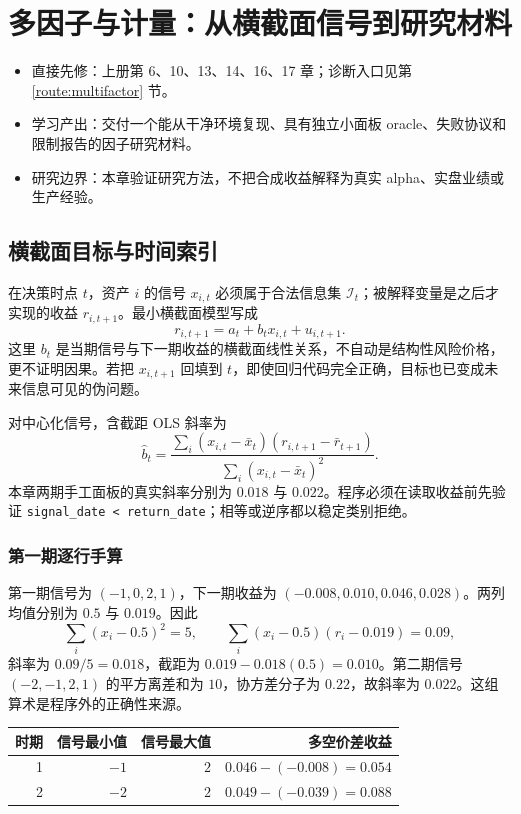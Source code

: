 \chapter{多因子与计量：从横截面信号到研究材料}
\label{ch:lower-multifactor}

\begin{itemize}
  \item 直接先修：上册第 6、10、13、14、16、17 章；诊断入口见第 \ref{route:multifactor} 节。
  \item 学习产出：交付一个能从干净环境复现、具有独立小面板 oracle、失败协议和限制报告的因子研究材料。
  \item 研究边界：本章验证研究方法，不把合成收益解释为真实 alpha、实盘业绩或生产经验。
\end{itemize}

\section{横截面目标与时间索引}

在决策时点 $t$，资产 $i$ 的信号 $x_{i,t}$ 必须属于合法信息集 $\mathcal I_t$；被解释变量是之后才实现的收益 $r_{i,t+1}$。最小横截面模型写成
\[
 r_{i,t+1}=a_t+b_t x_{i,t}+u_{i,t+1}.
\]
这里 $b_t$ 是当期信号与下一期收益的横截面线性关系，不自动是结构性风险价格，更不证明因果。若把 $x_{i,t+1}$ 回填到 $t$，即使回归代码完全正确，目标也已变成未来信息可见的伪问题。

对中心化信号，含截距 OLS 斜率为
\[
 \hat b_t=
 \frac{\sum_i(x_{i,t}-\bar x_t)(r_{i,t+1}-\bar r_{t+1})}
      {\sum_i(x_{i,t}-\bar x_t)^2}.
\]
本章两期手工面板的真实斜率分别为 $0.018$ 与 $0.022$。程序必须在读取收益前先验证 \texttt{signal\_date < return\_date}；相等或逆序都以稳定类别拒绝。

\subsection*{第一期逐行手算}

第一期信号为 $(-1,0,2,1)$，下一期收益为 $(-0.008,0.010,0.046,0.028)$。两列均值分别为 $0.5$ 与 $0.019$。因此
\[
 \sum_i(x_i-0.5)^2=5,
 \qquad
 \sum_i(x_i-0.5)(r_i-0.019)=0.09,
\]
斜率为 $0.09/5=0.018$，截距为 $0.019-0.018(0.5)=0.010$。第二期信号 $(-2,-1,2,1)$ 的平方离差和为 $10$，协方差分子为 $0.22$，故斜率为 $0.022$。这组算术是程序外的正确性来源。

\begin{longtable}{rrrr}
\toprule
时期 & 信号最小值 & 信号最大值 & 多空价差收益 \\
\midrule
1 & $-1$ & $2$ & $0.046-(-0.008)=0.054$ \\
2 & $-2$ & $2$ & $0.049-(-0.039)=0.088$ \\
\bottomrule
\end{longtable}

